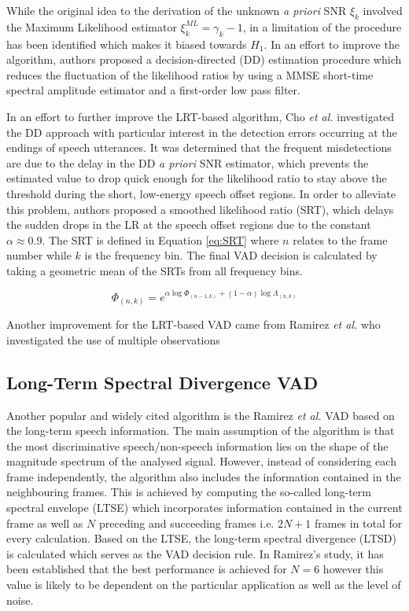 While the original idea to the derivation of the unknown \emph{a priori} SNR $\xi_k$ involved the Maximum Likelihood estimator $\xi_k^{ML} = \gamma_k - 1$, in \cite{Sohn} a limitation of the procedure has been identified which makes it biased towards $H_1$. In an effort to improve the algorithm, authors proposed a decision-directed (DD) estimation procedure which reduces the fluctuation of the likelihood ratios by using a MMSE short-time spectral amplitude estimator \cite{Ephraim} and a first-order low pass filter.

In an effort to further improve the LRT-based algorithm, Cho \emph{et al.} \cite{Cho} investigated the DD approach with particular interest in the detection errors occurring at the endings of speech utterances. It was determined that the frequent misdetections are due to the delay in the DD \emph{a priori} SNR estimator, which prevents the estimated value to drop quick enough for the likelihood ratio to stay above the threshold during the short, low-energy speech offset regions. In order to alleviate this problem, authors proposed a smoothed likelihood ratio (SRT), which delays the sudden drops in the LR at the speech offset regions due to the constant $\alpha \approx 0.9$. The SRT is defined in Equation \ref{eq:SRT} where $n$ relates to the frame number while $k$ is the frequency bin. The final VAD decision is calculated by taking a geometric mean of the SRTs from all frequency bins.

\begin{equation}
\Phi_{(n,k)} = e^{\alpha \log \Phi_{(n-1,k)} + (1-\alpha) \log \Lambda_{(n,k)}}
\label{eq:SRT}
\end{equation}

Another improvement for the LRT-based VAD came from Ramirez \emph{et al.} who investigated the use of multiple observations 

\subsection{Long-Term Spectral Divergence VAD}

Another popular and widely cited algorithm is the Ramirez \emph{et al.} \cite{LTSD} VAD based on the long-term speech information. The main assumption of the algorithm is that the most discriminative speech/non-speech information lies on the shape of the magnitude spectrum of the analysed signal. However, instead of considering each frame independently, the algorithm also includes the information contained in the neighbouring frames. This is achieved by computing the so-called long-term spectral envelope (LTSE) which incorporates information contained in the current frame as well as $N$ preceding and succeeding frames i.e. $2N+1$ frames in total for every calculation. Based on the LTSE, the long-term spectral divergence (LTSD) is calculated which serves as the VAD decision rule. In Ramirez's study, it has been established that the best performance is achieved for $N=6$ however this value is likely to be dependent on the particular application as well as the level of noise.

